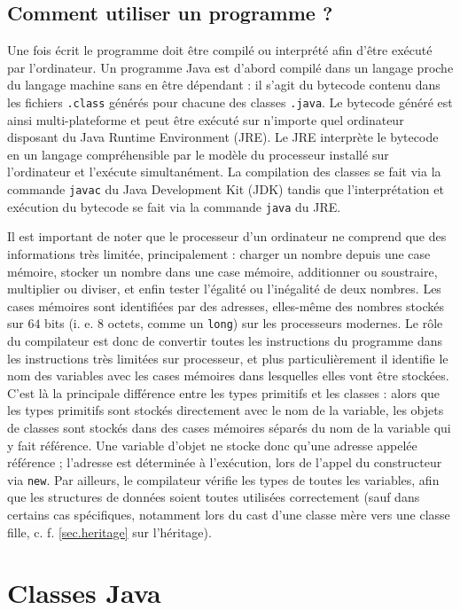 \documentclass[10pt]{article}
\begin{document}
\subsection{Comment utiliser un programme ?}

Une fois écrit le programme doit être compilé ou interprété afin d'être exécuté par l'ordinateur.
Un programme Java est d'abord compilé dans un langage proche du langage machine sans en être dépendant :
il s'agit du bytecode contenu dans les fichiers \texttt{.class} générés pour chacune des classes \texttt{.java}.
Le bytecode généré est ainsi multi-plateforme et peut être exécuté sur n'importe quel ordinateur disposant du
Java Runtime Environment (JRE). Le JRE interprète le bytecode en un langage
compréhensible par le modèle du processeur installé sur l'ordinateur et l'exécute simultanément. La compilation des classes se fait via la commande
\texttt{javac} du Java Development Kit (JDK) tandis que l'interprétation et exécution du bytecode se fait via la commande \texttt{java} du JRE.

Il est important de noter que le processeur d'un ordinateur ne comprend que des informations très limitée, principalement :
charger un nombre depuis une case mémoire, stocker un nombre dans une case mémoire, additionner ou soustraire, multiplier ou diviser,
et enfin tester l'égalité ou l'inégalité de deux nombres. Les cases mémoires sont identifiées par des adresses, elles-même des nombres
stockés sur $64$ bits (i. e. $8$ octets, comme un \texttt{long}) sur les processeurs modernes. Le rôle du compilateur est donc
de convertir toutes les instructions du programme dans les instructions très limitées sur processeur, et plus particulièrement
il identifie le nom des variables avec les cases mémoires dans lesquelles elles vont être stockées. C'est là la principale différence
entre les types primitifs et les classes : alors que les types primitifs sont stockés directement avec le nom de la variable,
les objets de classes sont stockés dans des cases mémoires séparés du nom de la variable qui y fait référence.
Une variable d'objet ne stocke donc qu'une adresse appelée référence ; l'adresse est déterminée à l'exécution, lors de l'appel du constructeur via \texttt{new}.
Par ailleurs, le compilateur vérifie les types de toutes les variables, afin que les structures de données soient toutes utilisées correctement
(sauf dans certains cas spécifiques, notamment lors du cast d'une classe mère vers une classe fille, c. f. \cref{sec.heritage} sur l'héritage).


\section{Classes Java}
\end{document}
